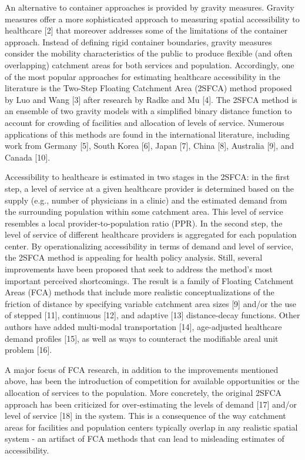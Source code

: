 \documentclass[10pt,letterpaper]{article}
\begin{document}
An alternative to container approaches is provided by gravity measures.
Gravity measures offer a more sophisticated approach to measuring
spatial accessibility to healthcare {[}2{]} that moreover addresses some
of the limitations of the container approach. Instead of defining rigid
container boundaries, gravity measures consider the mobility
characteristics of the public to produce flexible (and often
overlapping) catchment areas for both services and population.
Accordingly, one of the most popular approaches for estimating
healthcare accessibility in the literature is the Two-Step Floating
Catchment Area (2SFCA) method proposed by Luo and Wang {[}3{]} after
research by Radke and Mu {[}4{]}. The 2SFCA method is an ensemble of two
gravity models with a simplified binary distance function to account for
crowding of facilities and allocation of levels of service. Numerous
applications of this methods are found in the international literature,
including work from Germany {[}5{]}, South Korea {[}6{]}, Japan {[}7{]},
China {[}8{]}, Australia {[}9{]}, and Canada {[}10{]}.

Accessibility to healthcare is estimated in two stages in the 2SFCA: in
the first step, a level of service at a given healthcare provider is
determined based on the supply (e.g., number of physicians in a clinic)
and the estimated demand from the surrounding population within some
catchment area. This level of service resembles a local
provider-to-population ratio (PPR). In the second step, the level of
service of different healthcare providers is aggregated for each
population center. By operationalizing accessibility in terms of demand
and level of service, the 2SFCA method is appealing for health policy
analysis. Still, several improvements have been proposed that seek to
address the method's most important perceived shortcomings. The result
is a family of Floating Catchment Areas (FCA) methods that include more
realistic conceptualizations of the friction of distance by specifying
variable catchment area sizes {[}9{]} and/or the use of stepped
{[}11{]}, continuous {[}12{]}, and adaptive {[}13{]} distance-decay
functions. Other authors have added multi-modal transportation {[}14{]},
age-adjusted healthcare demand profiles {[}15{]}, as well as ways to
counteract the modifiable areal unit problem {[}16{]}.

A major focus of FCA research, in addition to the improvements mentioned
above, has been the introduction of competition for available
opportunities or the allocation of services to the population. More
concretely, the original 2SFCA approach has been criticized for
over-estimating the levels of demand {[}17{]} and/or level of service
{[}18{]} in the system. This is a consequence of the way catchment areas
for facilities and population centers typically overlap in any realistic
spatial system - an artifact of FCA methods that can lead to misleading
estimates of accessibility.
\end{document}
